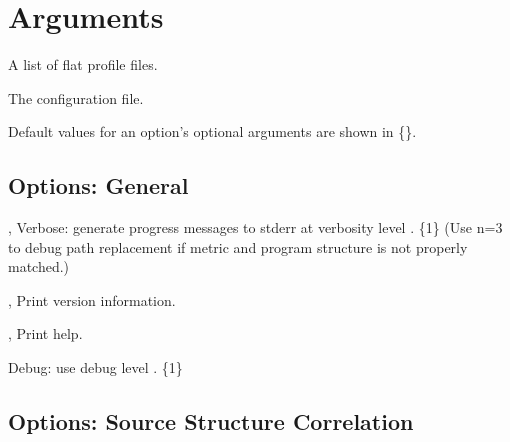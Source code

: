 \documentclass[english]{article}
\begin{document}
\section{Arguments}

\begin{Description}
\item[\Arg{profile-file...}] A list of flat profile files.
\item[\Arg{config-file}] The  configuration file.
\end{Description}

Default values for an option's optional arguments are shown in \{\}.

\subsection{Options: General}

\begin{Description}
\item[\OptoArg{-v}{n}, \OptoArg{--verbose}{n}]
Verbose: generate progress messages to stderr at verbosity level .  \{1\}  (Use n=3 to debug path replacement if metric and program structure is not properly matched.)

\item[\Opt{-V}, \Opt{--version}]
Print version information.

\item[\Opt{-h}, \Opt{--help}]
Print help.

\item[\OptoArg{--debug}{n}]
Debug: use debug level . \{1\}
\end{Description}

\subsection{Options: Source Structure Correlation}
\end{document}
